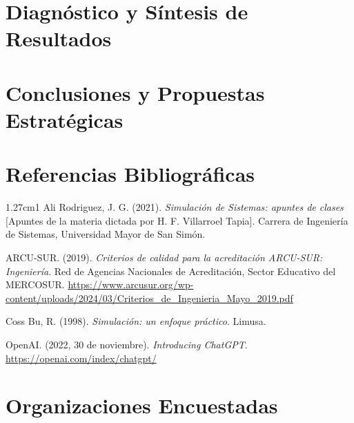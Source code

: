 \documentclass[12pt, a4paper]{article}
\begin{document}
\section{Diagnóstico y Síntesis de Resultados}\label{sec:diagnostico}

\section{Conclusiones y Propuestas Estratégicas}

\section*{Referencias Bibliográficas}

\begin{hangparas}{1.27cm}{1}
Ali Rodriguez, J. G. (2021). \textit{Simulación de Sistemas: apuntes de
clases} [Apuntes de la materia dictada por H. F. Villarroel Tapia].
Carrera de Ingeniería de Sistemas, Universidad Mayor de San Simón.

ARCU-SUR. (2019). \textit{Criterios de calidad para la acreditación
ARCU-SUR: Ingeniería}. Red de Agencias Nacionales de Acreditación,
Sector Educativo del MERCOSUR.
\url{https://www.arcusur.org/wp-content/uploads/2024/03/Criterios_de_Ingenieria_Mayo_2019.pdf}

Coss Bu, R. (1998). \textit{Simulación: un enfoque práctico}. Limusa.

OpenAI. (2022, 30 de noviembre). \textit{Introducing ChatGPT}.
\url{https://openai.com/index/chatgpt/}
\end{hangparas}

\appendix

\section{Organizaciones Encuestadas}\label{anexo:organizaciones}


\end{document}
